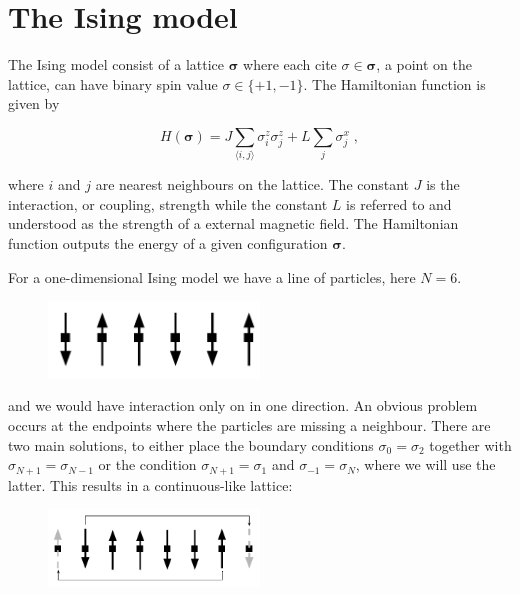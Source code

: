 \section{The Ising model}\label{sec:ising_theory}

The Ising model consist of a lattice $\boldsymbol{\sigma}$ where each cite $\sigma \in \boldsymbol{\sigma}$, a point on the lattice, can have binary spin value $\sigma \in \{+1, -1\}$. The Hamiltonian function is given by

\begin{equation}
  H(\boldsymbol{\sigma}) =J\sum_{\langle i,j\rangle} \sigma^z_i\sigma^z_j + L \sum_j \sigma^x_j \; ,
  \label{eq:Ising_hamiltonian}
\end{equation}

where $i$ and $j$ are nearest neighbours on the lattice. The constant $J$ is the interaction, or coupling, strength while the constant $L$ is referred to and understood as the strength of a external magnetic field. The Hamiltonian function outputs the energy of a given configuration $\boldsymbol{\sigma}$.

For a one-dimensional Ising model we have a line of particles, here $N = 6$.

\begin{figure}[H]
  \begin{center}
    \includegraphics[width=0.5\textwidth]{Figures/Drawn/Ising/ising 1d}
  \end{center}
\end{figure}

and we would have interaction only on in one direction. An obvious problem occurs at the endpoints where the particles are missing a neighbour. There are two main solutions, to either place the boundary conditions $\sigma_{0} = \sigma_{2}$ together with $\sigma_{N+1} = \sigma_{N-1}$ or the condition $\sigma_{N+1} = \sigma_{1}$ and $\sigma_{-1} = \sigma_N$, where we will use the latter. This results in a continuous-like lattice:

\begin{figure}[H]
  \begin{center}
    \includegraphics[width=0.5\textwidth]{Figures/Drawn/Ising/ising1dciclous}
  \end{center}
\end{figure}

